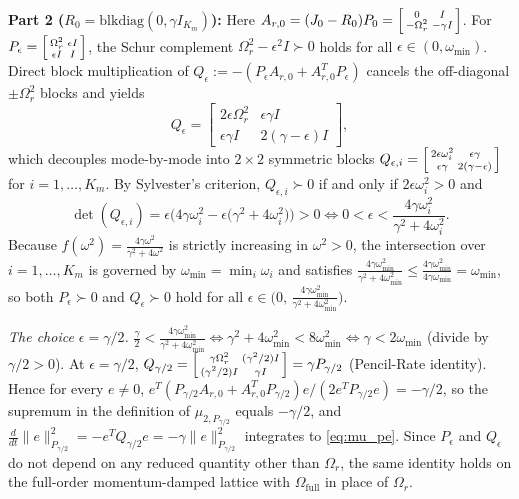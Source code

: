 \textbf{Part 2 (\(R_0 = \mathrm{blkdiag}(0, \gamma I_{K_m})\)):} Here \(A_{r,0} = (J_0 - R_0)P_0 = \begin{bsmallmatrix} 0 & I \\ -\Omega_r^2 & -\gamma I \end{bsmallmatrix}\). For \(P_\epsilon = \begin{bsmallmatrix} \Omega_r^2 & \epsilon I \\ \epsilon I & I \end{bsmallmatrix}\), the Schur complement \(\Omega_r^2 - \epsilon^2 I \succ 0\) holds for all \(\epsilon \in (0, \omega_{\min})\). Direct block multiplication of \(Q_\epsilon := -(P_\epsilon A_{r,0} + A_{r,0}^T P_\epsilon)\) cancels the off-diagonal \(\pm \Omega_r^2\) blocks and yields
\[
Q_\epsilon = \begin{bmatrix} 2\epsilon \Omega_r^2 & \epsilon \gamma I \\ \epsilon \gamma I & 2(\gamma - \epsilon)I \end{bmatrix},
\]
which decouples mode-by-mode into \(2 \times 2\) symmetric blocks \(Q_{\epsilon,i} = \begin{bsmallmatrix} 2\epsilon\omega_i^2 & \epsilon\gamma \\ \epsilon\gamma & 2(\gamma - \epsilon) \end{bsmallmatrix}\) for \(i = 1, \dots, K_m\). By Sylvester's criterion, \(Q_{\epsilon,i} \succ 0\) if and only if \(2\epsilon\omega_i^2 > 0\) and
\[
\det(Q_{\epsilon,i}) = \epsilon\Big(4\gamma\omega_i^2 - \epsilon\big(\gamma^2 + 4\omega_i^2\big)\Big) > 0 \iff 0 < \epsilon < \frac{4\gamma\omega_i^2}{\gamma^2 + 4\omega_i^2}.
\]
Because \(f(\omega^2) = \frac{4\gamma\omega^2}{\gamma^2 + 4\omega^2}\) is strictly increasing in \(\omega^2 > 0\), the intersection over \(i = 1, \dots, K_m\) is governed by \(\omega_{\min} = \min_i \omega_i\) and satisfies \(\frac{4\gamma\omega_{\min}^2}{\gamma^2 + 4\omega_{\min}^2} \le \frac{4\gamma\omega_{\min}^2}{4\gamma\omega_{\min}} = \omega_{\min}\), so both \(P_\epsilon \succ 0\) and \(Q_\epsilon \succ 0\) hold for all \(\epsilon \in \big(0,\, \frac{4\gamma \omega_{\min}^2}{\gamma^2 + 4\omega_{\min}^2}\big)\).

\emph{The choice \(\epsilon = \gamma/2\).} \(\frac{\gamma}{2} < \frac{4\gamma\omega_{\min}^2}{\gamma^2 + 4\omega_{\min}^2} \iff \gamma^2 + 4\omega_{\min}^2 < 8\omega_{\min}^2 \iff \gamma < 2\omega_{\min}\) (divide by \(\gamma/2 > 0\)). At \(\epsilon = \gamma/2\), \(Q_{\gamma/2} = \begin{bsmallmatrix} \gamma\Omega_r^2 & (\gamma^2/2) I \\ (\gamma^2/2) I & \gamma I \end{bsmallmatrix} = \gamma P_{\gamma/2}\) (Pencil-Rate identity). Hence for every \(e \neq 0\), \(e^T(P_{\gamma/2}A_{r,0} + A_{r,0}^TP_{\gamma/2})e/(2e^TP_{\gamma/2}e) = -\gamma/2\), so the supremum in the definition of \(\mu_{2,P_{\gamma/2}}\) equals \(-\gamma/2\), and \(\frac{d}{dt}\|e\|_{P_{\gamma/2}}^2 = -e^TQ_{\gamma/2}e = -\gamma\|e\|_{P_{\gamma/2}}^2\) integrates to \eqref{eq:mu_pe}. Since \(P_\epsilon\) and \(Q_\epsilon\) do not depend on any reduced quantity other than \(\Omega_r\), the same identity holds on the full-order momentum-damped lattice with \(\Omega_{\mathrm{full}}\) in place of \(\Omega_r\).

